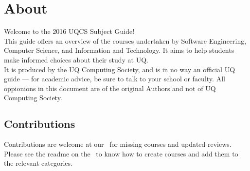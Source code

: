 \section{About}
\hypertarget{core:about}{}
Welcome to the 2016 UQCS Subject Guide!\\

\noindent
This guide offers an overview of the courses undertaken by Software Engineering, Computer Science, and Information and Technology.
It aims to help students make informed choices about their study at UQ.\\

\noindent
It is produced by the UQ Computing Society, and is in no way an official UQ guide --- for academic advice, be sure to talk to your school or faculty.
All oppionions in this document are of the original Authors and not of UQ Computing Society.

\subsection{Contributions}

Contributions are welcome at our \href{}{\faGithub}\ for missing courses and updated reviews. Please see the readme
on the \faGithub\ to know how to create courses and add them to the relevant categories.